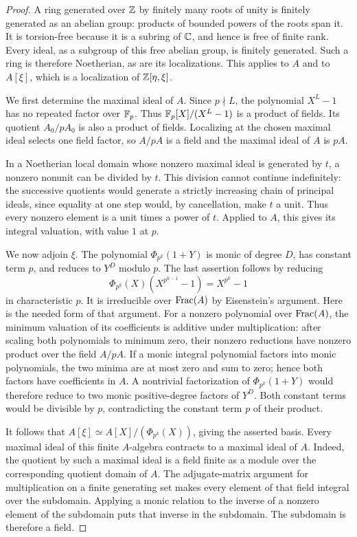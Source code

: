 \begin{proof}
A ring generated over \(\mathbb Z\) by finitely many roots of unity is
finitely generated as an abelian group: products of bounded powers
of the roots span it. It is torsion-free because it is a subring of
\(\mathbb C\), and hence is free of finite rank. Every ideal, as a subgroup
of this free abelian group, is finitely generated. Such a ring is
therefore Noetherian, as are its localizations. This applies to \(A\)
and to \(A[\xi]\), which is a localization of \(\mathbb Z[\eta,\xi]\).

We first determine the maximal ideal of \(A\). Since \(p\nmid L\),
the polynomial \(X^L-1\) has no repeated factor over \(\mathbb F_p\).
Thus \(\mathbb F_p[X]/(X^L-1)\) is a product of fields. Its quotient
\(A_0/pA_0\) is also a product of fields. Localizing at the chosen
maximal ideal selects one field factor, so \(A/pA\) is a field and
the maximal ideal of \(A\) is \(pA\).

In a Noetherian local domain whose nonzero maximal ideal is generated
by \(t\), a nonzero nonunit can be divided by \(t\). This division
cannot continue indefinitely: the successive quotients would generate
a strictly increasing chain of principal ideals, since equality at
one step would, by cancellation, make \(t\) a unit. Thus every
nonzero element is a unit times a power of \(t\). Applied to \(A\),
this gives its integral valuation, with value \(1\) at \(p\).

We now adjoin \(\xi\). The polynomial \(\Phi_{p^k}(1+Y)\) is monic
of degree \(D\), has constant term \(p\), and reduces to \(Y^D\)
modulo \(p\). The last assertion follows by reducing
\[
 \Phi_{p^k}(X)(X^{p^{k-1}}-1)=X^{p^k}-1
\]
in characteristic \(p\). It is irreducible over \(\operatorname{Frac}(A)\) by
Eisenstein's argument. Here is the needed form of that argument.
For a nonzero polynomial over \(\operatorname{Frac}(A)\), the minimum valuation of
its coefficients is additive under multiplication: after scaling both
polynomials to minimum zero, their nonzero reductions have nonzero
product over the field \(A/pA\). If a monic integral polynomial
factors into monic polynomials, the two minima are at most zero and
sum to zero; hence both factors have coefficients in \(A\).
A nontrivial factorization of \(\Phi_{p^k}(1+Y)\) would therefore
reduce to two monic positive-degree factors of \(Y^D\). Both constant
terms would be divisible by \(p\), contradicting the constant term
\(p\) of their product.

It follows that \(A[\xi]\simeq A[X]/(\Phi_{p^k}(X))\), giving the
asserted basis. Every maximal ideal of this finite \(A\)-algebra
contracts to a maximal ideal of \(A\). Indeed, the quotient by
such a maximal ideal is a field finite as a module over the corresponding
quotient domain of \(A\). The adjugate-matrix argument for
multiplication on a finite generating set makes every element of that
field integral over the subdomain. Applying a monic relation to the
inverse of a nonzero element of the subdomain puts that inverse in the
subdomain. The subdomain is therefore a field.


\end{proof}
